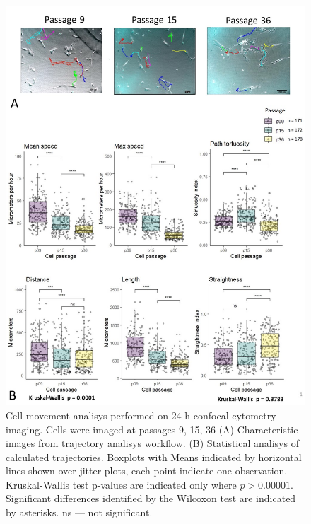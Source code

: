\documentclass[alpha-refs]{wiley-article}
\begin{document}
\begin{figure}[hbt!]
  \includegraphics[width=1\linewidth]{traj.jpg}
  \caption{Cell movement analisys performed on 24 h confocal cytometry imaging. Cells were imaged at passages 9, 15, 36 (A) Characteristic images from trajectory analisys workflow. (B) Statistical analisys of calculated trajectories. Boxplots with Means indicated by horizontal lines shown over jitter plots, each point indicate one observation. Kruskal-Wallis test p-values are indicated only where $p > 0.00001$. Significant differences identified by the Wilcoxon test are indicated by asterisks. ns --- not significant.}
  \centering
\end{figure}
\end{document}
